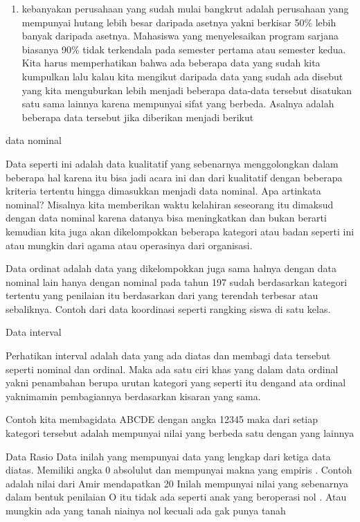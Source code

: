 \documentclass[
]{book}
\providecommand{\tightlist}{%
  \setlength{\itemsep}{0pt}\setlength{\parskip}{0pt}}
\theoremstyle{definition}
\theoremstyle{definition}
\theoremstyle{definition}
\theoremstyle{definition}
\theoremstyle{remark}
\begin{document}
\begin{enumerate}
\def\labelenumi{\arabic{enumi}.}
\tightlist
\item
  kebanyakan perusahaan yang sudah mulai bangkrut adalah perusahaan yang mempunyai hutang lebih besar daripada asetnya yakni berkisar 50\% lebih banyak daripada asetnya.
  Mahasiswa yang menyelesaikan program sarjana biasanya 90\% tidak terkendala pada semester pertama atau semester kedua.
  Kita harus memperhatikan bahwa ada beberapa data yang sudah kita kumpulkan lalu kalau kita mengikut daripada data yang sudah ada disebut yang kita menguburkan lebih menjadi beberapa data-data tersebut disatukan satu sama lainnya karena mempunyai sifat yang berbeda. Asalnya adalah beberapa data tersebut jika diberikan menjadi berikut
\end{enumerate}

data nominal

Data seperti ini adalah data kualitatif yang sebenarnya menggolongkan dalam beberapa hal karena itu bisa jadi acara ini dan dari kualitatif dengan beberapa kriteria tertentu hingga dimasukkan menjadi data nominal. Apa artinkata nominal?
Misalnya kita memberikan waktu kelahiran seseorang itu dimaksud dengan data nominal karena datanya bisa meningkatkan dan bukan berarti kemudian kita juga akan dikelompokkan beberapa kategori atau badan seperti ini atau mungkin dari agama atau operasinya dari organisasi.

Data ordinat adalah data yang dikelompokkan juga sama halnya dengan data nominal lain hanya dengan nominal pada tahun 197 sudah berdasarkan kategori tertentu yang penilaian itu berdasarkan dari yang terendah terbesar atau sebaliknya. Contoh dari data koordinasi seperti rangking siswa di satu kelas.

Data interval

Perhatikan interval adalah data yang ada diatas dan membagi data tersebut seperti nominal dan ordinal. Maka ada satu ciri khas yang dalam data ordinal yakni penambahan berupa urutan kategori yang seperti itu dengand ata ordinal yaknimamin pembagiannya berdasarkan kisaran yang sama.

Contoh kita membagidata ABCDE dengan angka 12345 maka dari setiap kategori tersebut adalah mempunyai nilai yang berbeda satu dengan yang lainnya

Data Rasio
Data inilah yang mempunyai data yang lengkap dari ketiga data diatas. Memiliki angka 0 absolulut dan mempunyai makna yang empiris . Contoh adalah nilai dari Amir mendapatkan 20
Inilah mempunyai nilai yang sebenarnya dalam bentuk penilaian O itu tidak ada seperti anak yang beroperasi nol . Atau mungkin ada yang tanah niainya nol kecuali ada gak punya tanah
\end{document}
